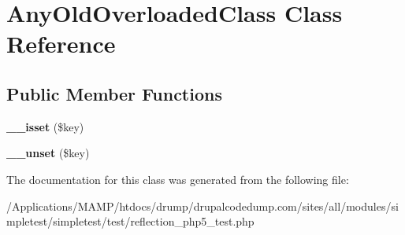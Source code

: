 \hypertarget{class_any_old_overloaded_class}{
\section{AnyOldOverloadedClass Class Reference}
\label{class_any_old_overloaded_class}
}
\subsection*{Public Member Functions}
\begin{DoxyCompactItemize}
\item 
\hypertarget{class_any_old_overloaded_class_a5072ceb68b924db6fcde86adbd2b80e4}{
{\bfseries \_\-\_\-isset} (\$key)}
\label{class_any_old_overloaded_class_a5072ceb68b924db6fcde86adbd2b80e4}

\item 
\hypertarget{class_any_old_overloaded_class_a88a6a182207aee9175e21b97bf570b09}{
{\bfseries \_\-\_\-unset} (\$key)}
\label{class_any_old_overloaded_class_a88a6a182207aee9175e21b97bf570b09}

\end{DoxyCompactItemize}


The documentation for this class was generated from the following file:\begin{DoxyCompactItemize}
\item 
/Applications/MAMP/htdocs/drump/drupalcodedump.com/sites/all/modules/simpletest/simpletest/test/reflection\_\-php5\_\-test.php\end{DoxyCompactItemize}

